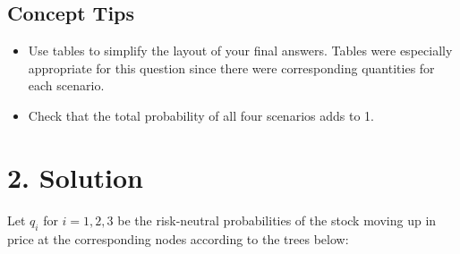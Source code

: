 \documentclass[11pt]{article}
\begin{document}
		\subsection*{Concept Tips}
			\begin{itemize}
				\item Use tables to simplify the layout of your final answers. Tables were especially appropriate for this question since there were corresponding quantities for each scenario.
				\item Check that the total probability of all four scenarios adds to 1.
			\end{itemize}
	\section*{2. Solution}
	Let $q_{i}$ for $i=1,2,3$ be the risk-neutral probabilities of the stock moving up in price at the corresponding nodes according to the trees below:
\end{document}
